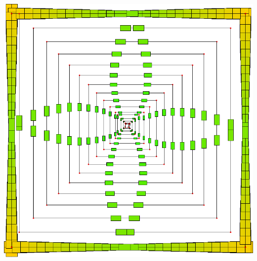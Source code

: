 \documentclass[10pt]{article}
\begin{document}
\begin{center}
\includegraphics[scale=.5]{./asytopdf/insolite2.pdf}
\end{center}

\end{document}
